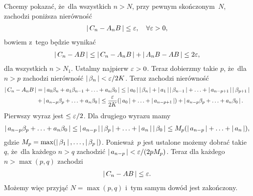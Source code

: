 \documentclass[a4paper,11pt]{article}
\begin{document}
Chcemy pokazać, że~dla wszystkich $n > N$, przy pewnym skończonym~$N$,
zachodzi poniższa nierówność
\begin{equation}
  \label{eq:Leja-12}
  \begin{split}
    \left| \,  C_{ n } - A_{ n } B  \, \right| \leq \varepsilon, \quad \forall \varepsilon > 0,
  \end{split}
\end{equation}
bowiem z~tego będzie wynikać
\begin{equation}
  \label{eq:Leja-13}
  \begin{split}
    \left| \,  C_{ n } - AB  \, \right| \leq \left| \,  C_{ n } - A_{ n } B  \, \right| + \left| \, 
      A_{ n } B - AB  \, \right| \leq 2\varepsilon,
  \end{split}
\end{equation}
dla wszystkich $n > N_{ 1 }$. Ustalmy najpierw $\varepsilon > 0$. Teraz
dobierzmy takie $p$, że~dla $n > p$ zachodzi nierówność
$\left| \,  \beta_{ n }  \, \right| < \varepsilon / 2K$. Teraz zachodzi nierówność
\begin{equation}
  \label{eq:Leja-14}
  \begin{split}
    \left| \,  C_{ n } - A_{ n } B  \, \right| &= \left| \,  a_{ 0 } \beta_{ n } + a_{ 1 }
      \beta_{ n - 1 } + \ldots + a_{ n } \beta_{ 0 }  \, \right| \leq \left| \,  a_{ 0 }  \, \right|
    \left| \,  \beta_{ n }  \, \right| + \left| \,  a_{ 1 }  \, \right| \left| \,  \beta_{ n - 1 }  \, \right| + \ldots
    + \left| \,  a_{ n - p + 1 }  \, \right|
    \left| \,  \beta_{ p + 1 }  \, \right| \\
    &+ \left| \,  a_{ n - p } \beta_{ p } + \ldots + a_{ n } \beta_{ 0 }  \, \right| \leq
    \frac{ \varepsilon }{ 2K } ( \left| \,  a_{ 0 }  \, \right| + \ldots + \left| \,  a_{ n - p + 1
      }  \, \right| ) + \left| \,  a_{ n - p } \beta_{ p } + \ldots + a_{ n } \beta_{ 0 }
     \, \right|.
  \end{split}
\end{equation}
Pierwszy wyraz jest $\leq \varepsilon / 2$. Dla drugiego wyrazu mamy
\begin{equation}
  \label{eq:Leja-15}
  \begin{split}
    \left| \,  a_{ n - p } \beta_{ p } + \ldots + a_{ n } \beta_{ 0 }  \, \right| \leq
    \left| \,  a_{ n - p }  \, \right| \left| \,  \beta_{ p }  \, \right| + \ldots + \left| \,  a_{ n }  \, \right|
    \left| \,  \beta_{ 0 }  \, \right| \leq M_{ p } ( \left| \,  a_{ n - p }  \, \right| + \ldots +
    \left| \,  a_{ n }  \, \right| ),
  \end{split}
\end{equation}
gdzie $M_{ p } = \max( \left| \,  \beta_{ 1 }  \, \right|, \ldots, \left| \,  \beta_{ p }  \, \right| )$.
Ponieważ~$p$ jest ustalone możemy dobrać takie $q$, że~dla każdego
$n > q$ zachodzić $\left| \,  a_{ n - p }  \, \right| < \varepsilon / ( 2 p M_{ p } )$.
Teraz dla każdego $n > \max( p, q )$ zachodzi
\begin{equation}
  \label{eq:Leja-16}
  \begin{split}
    \left| \,  C_{ n } - AB  \, \right| \leq \varepsilon.
  \end{split}
\end{equation}
Możemy więc przyjąć $N = \max( p, q )$ i~tym samym dowód jest
zakończony.
\end{document}
